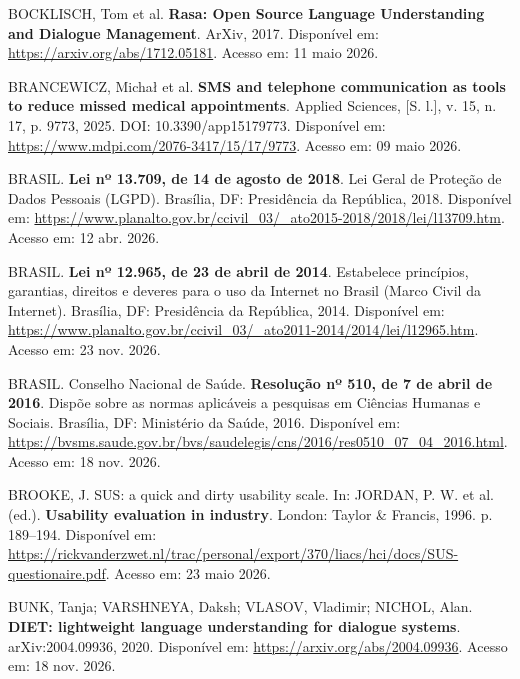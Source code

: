 \documentclass[12pt,a4paper]{extarticle}
\begin{document}
\vspace{0.5cm}\noindent
BOCKLISCH, Tom et al. \textbf{Rasa: Open Source Language Understanding and Dialogue Management}. ArXiv, 2017. Disponível em: \url{https://arxiv.org/abs/1712.05181}. Acesso em: 11 maio 2026.

\vspace{0.5cm}\noindent
BRANCEWICZ, Michał et al. \textbf{SMS and telephone communication as tools to reduce missed medical appointments}. Applied Sciences, [S. l.], v. 15, n. 17, p. 9773, 2025. DOI: 10.3390/app15179773. Disponível em: \url{https://www.mdpi.com/2076-3417/15/17/9773}. Acesso em: 09 maio 2026.

\vspace{0.5cm}\noindent
BRASIL. \textbf{Lei nº 13.709, de 14 de agosto de 2018}. Lei Geral de Proteção de Dados Pessoais (LGPD). Brasília, DF: Presidência da República, 2018. Disponível em: \url{https://www.planalto.gov.br/ccivil_03/_ato2015-2018/2018/lei/l13709.htm}. Acesso em: 12 abr. 2026.

\vspace{0.5cm}\noindent
BRASIL. \textbf{Lei nº 12.965, de 23 de abril de 2014}. Estabelece princípios, garantias, direitos e deveres para o uso da Internet no Brasil (Marco Civil da Internet). Brasília, DF: Presidência da República, 2014. Disponível em: \url{https://www.planalto.gov.br/ccivil_03/_ato2011-2014/2014/lei/l12965.htm}. Acesso em: 23 nov. 2026.

\vspace{0.5cm}\noindent
BRASIL. Conselho Nacional de Saúde. \textbf{Resolução nº 510, de 7 de abril de 2016}. Dispõe sobre as normas aplicáveis a pesquisas em Ciências Humanas e Sociais. Brasília, DF: Ministério da Saúde, 2016. Disponível em: \url{https://bvsms.saude.gov.br/bvs/saudelegis/cns/2016/res0510_07_04_2016.html}. Acesso em: 18 nov. 2026.

\vspace{0.5cm}\noindent
BROOKE, J. SUS: a quick and dirty usability scale. In: JORDAN, P. W. et al. (ed.). \textbf{Usability evaluation in industry}. London: Taylor \& Francis, 1996. p. 189--194. Disponível em: \url{https://rickvanderzwet.nl/trac/personal/export/370/liacs/hci/docs/SUS-questionaire.pdf}. Acesso em: 23 maio 2026.

\vspace{0.5cm}\noindent
BUNK, Tanja; VARSHNEYA, Daksh; VLASOV, Vladimir; NICHOL, Alan. \textbf{DIET: lightweight language understanding for dialogue systems}. arXiv:2004.09936, 2020. Disponível em: \url{https://arxiv.org/abs/2004.09936}. Acesso em: 18 nov. 2026.
\end{document}
